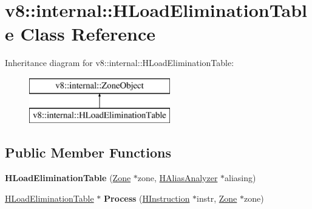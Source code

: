 \hypertarget{classv8_1_1internal_1_1_h_load_elimination_table}{}\section{v8\+:\+:internal\+:\+:H\+Load\+Elimination\+Table Class Reference}
\label{classv8_1_1internal_1_1_h_load_elimination_table}
Inheritance diagram for v8\+:\+:internal\+:\+:H\+Load\+Elimination\+Table\+:\begin{figure}[H]
\begin{center}
\leavevmode
\includegraphics[height=2.000000cm]{classv8_1_1internal_1_1_h_load_elimination_table}
\end{center}
\end{figure}
\subsection*{Public Member Functions}
\begin{DoxyCompactItemize}
\item 
\hypertarget{classv8_1_1internal_1_1_h_load_elimination_table_aa6c01ae747f01639ac6f860d651bda28}{}{\bfseries H\+Load\+Elimination\+Table} (\hyperlink{classv8_1_1internal_1_1_zone}{Zone} $\ast$zone, \hyperlink{classv8_1_1internal_1_1_h_alias_analyzer}{H\+Alias\+Analyzer} $\ast$aliasing)\label{classv8_1_1internal_1_1_h_load_elimination_table_aa6c01ae747f01639ac6f860d651bda28}

\item 
\hypertarget{classv8_1_1internal_1_1_h_load_elimination_table_ac18e4f7b207db6804915ecca4957eb4a}{}\hyperlink{classv8_1_1internal_1_1_h_load_elimination_table}{H\+Load\+Elimination\+Table} $\ast$ {\bfseries Process} (\hyperlink{classv8_1_1internal_1_1_h_instruction}{H\+Instruction} $\ast$instr, \hyperlink{classv8_1_1internal_1_1_zone}{Zone} $\ast$zone)\label{classv8_1_1internal_1_1_h_load_elimination_table_ac18e4f7b207db6804915ecca4957eb4a}

\end{DoxyCompactItemize}
